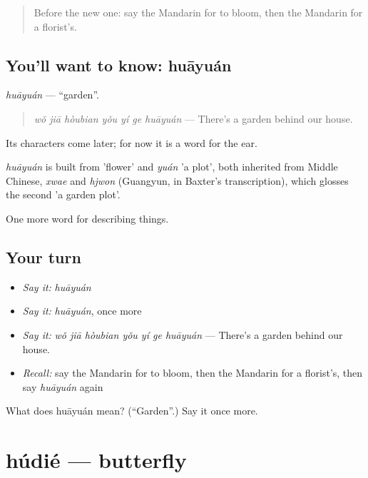 \begin{quote}
Before the new one: say the Mandarin for to bloom, then the Mandarin for a florist's.
\end{quote}

\subsection*{You'll want to know: huāyuán}
\emph{huāyuán} — \textquotedblleft{}garden\textquotedblright{}.

\begin{quote}
\emph{wǒ jiā hòubian yǒu yí ge huāyuán} — There's a garden behind our house.
\end{quote}

Its characters come later; for now it is a word for the ear.

\begin{cousinweb}
\emph{huāyuán} is built from  'flower' and \emph{yuán} 'a plot', both inherited from Middle Chinese, \emph{xwae} and \emph{hjwon} (Guangyun, in Baxter's transcription), which glosses the second 'a garden plot'.
\end{cousinweb}

\begin{grammarlens}[title={What you've built}]
One more word for describing things.
\end{grammarlens}

\subsection*{Your turn}
\begin{itemize}
\raggedright
  \item \emph{Say it:} \emph{huāyuán}
  \item \emph{Say it:} \emph{huāyuán}, once more
  \item \emph{Say it:} \emph{wǒ jiā hòubian yǒu yí ge huāyuán} — There's a garden behind our house.
  \item \emph{Recall:} say the Mandarin for to bloom, then the Mandarin for a florist's, then say \emph{huāyuán} again
\end{itemize}

\begin{tcolorbox}[breakable,colback=teal!4,colframe=teal!35!black,title={Before you move on}]
What does huāyuán mean? (\textquotedblleft{}Garden\textquotedblright{}.) Say it once more.
\end{tcolorbox}
\section[húdié]{húdié — butterfly}

